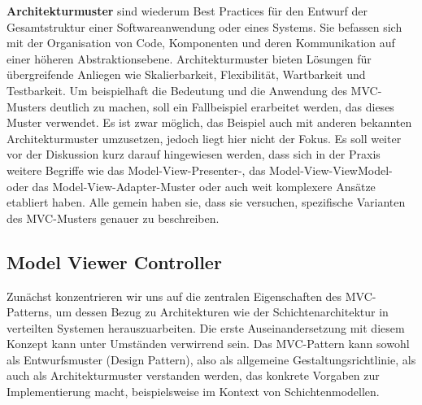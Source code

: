 \documentclass[../vs-script-first-v01.tex]{subfiles}
\begin{document}
\textbf{Architekturmuster} sind wiederum Best Practices für den Entwurf der Gesamtstruktur einer Softwareanwendung oder eines Systems. Sie befassen sich mit der Organisation von Code, Komponenten und deren Kommunikation auf einer höheren Abstraktionsebene. Architekturmuster bieten Lösungen für übergreifende Anliegen wie Skalierbarkeit, Flexibilität, Wartbarkeit und Testbarkeit.
Um beispielhaft die Bedeutung und die Anwendung des MVC-Musters deutlich zu machen, soll ein Fallbeispiel erarbeitet werden, das dieses Muster verwendet. Es ist zwar möglich, das Beispiel auch mit anderen bekannten Architekturmuster umzusetzen, jedoch liegt hier nicht der Fokus. Es soll weiter vor der Diskussion kurz darauf hingewiesen werden, dass sich in der Praxis  weitere Begriffe wie das Model-View-Presenter-, das Model-View-ViewModel- oder das Model-View-Adapter-Muster oder auch weit komplexere Ansätze etabliert haben. Alle gemein haben sie, dass sie versuchen, spezifische Varianten des MVC-Musters genauer zu beschreiben.
\subsection{Model Viewer Controller}
Zunächst konzentrieren wir uns auf die zentralen Eigenschaften des MVC-Patterns, um dessen Bezug zu Architekturen wie der Schichtenarchitektur in verteilten Systemen herauszuarbeiten. Die erste Auseinandersetzung mit diesem Konzept kann unter Umständen verwirrend sein. Das MVC-Pattern kann sowohl als Entwurfsmuster (Design Pattern), also als allgemeine Gestaltungsrichtlinie, als auch als Architekturmuster verstanden werden, das konkrete Vorgaben zur Implementierung macht, beispielsweise im Kontext von Schichtenmodellen.
\end{document}
